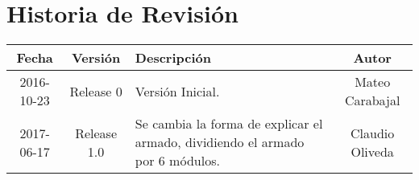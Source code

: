 \chapter{Historia de Revisión}


\begin{tabular}{|c|c|p{8cm}|c|}
	\hline
	\textbf{Fecha} & \textbf{Versión} & \textbf{Descripción}                                                          & \textbf{Autor}  \\[0.5cm] \hline\hline
	2016-10-23   &    Release 0     & Versión Inicial.                                                              & Mateo Carabajal \\[0.5cm] \hline
	2017-06-17   &   Release 1.0    & Se cambia la forma de explicar el armado, dividiendo el armado por 6 módulos. & Claudio Oliveda \\[0.5cm] \hline
\end{tabular} 




